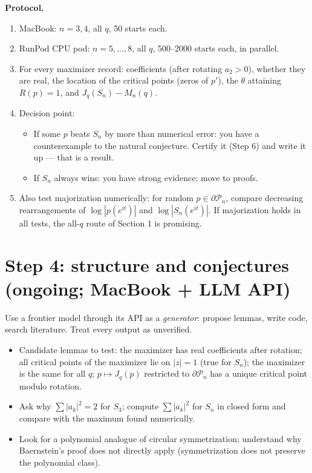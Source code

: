 \documentclass[11pt]{article}
\newcommand{\Pn}{\mathcal P_n}
\begin{document}
\textbf{Protocol.}
\begin{enumerate}[leftmargin=*]
\item MacBook: $n=3,4$, all $q$, 50 starts each.
\item RunPod CPU pod: $n=5,\dots,8$, all $q$, 500--2000 starts each, in parallel.
\item For every maximizer record: coefficients (after rotating $a_2>0$), whether they are real, the location of the critical points (zeros of $p'$), the $\theta$ attaining $R(p)=1$, and $J_q(S_n)-M_n(q)$.
\item Decision point:
  \begin{itemize}[nosep]
  \item If some $p$ beats $S_n$ by more than numerical error: you have a counterexample to the natural conjecture. Certify it (Step 6) and write it up --- that is a result.
  \item If $S_n$ always wins: you have strong evidence; move to proofs.
  \end{itemize}
\item Also test majorization numerically: for random $p\in\partial\Pn$, compare decreasing rearrangements of $\log|p(e^{it})|$ and $\log|S_n(e^{it})|$. If majorization holds in all tests, the all-$q$ route of Section 1 is promising.
\end{enumerate}

\section{Step 4: structure and conjectures (ongoing; MacBook + LLM API)}

Use a frontier model through its API as a \emph{generator}: propose lemmas, write code, search literature. Treat every output as unverified.
\begin{itemize}[nosep]
\item Candidate lemmas to test: the maximizer has real coefficients after rotation; all critical points of the maximizer lie on $|z|=1$ (true for $S_n$); the maximizer is the same for all $q$; $p\mapsto J_q(p)$ restricted to $\partial\Pn$ has a unique critical point modulo rotation.
\item Ask why $\sum|a_k|^2=2$ for $S_3$; compute $\sum|a_k|^2$ for $S_n$ in closed form and compare with the maximum found numerically.
\item Look for a polynomial analogue of circular symmetrization; understand why Baernstein's proof does not directly apply (symmetrization does not preserve the polynomial class).
\end{itemize}
\end{document}

